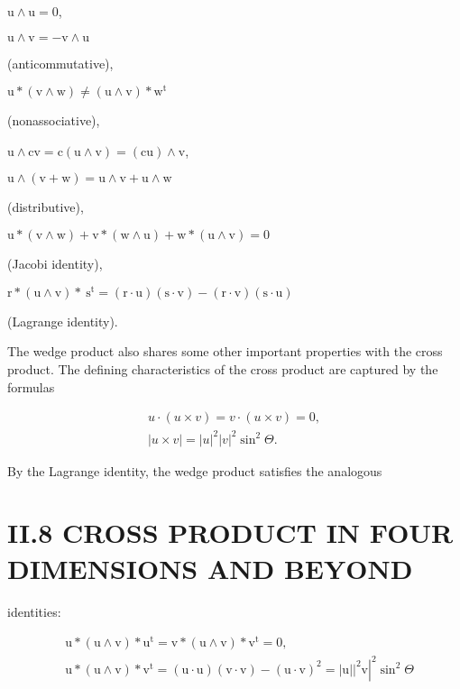 \begin{CJK}{UTF8}{gbsn}
$\mathrm{u} \wedge \mathrm{u}=0$,

$\mathrm{u} \wedge \mathrm{v}=-\mathrm{v} \wedge \mathrm{u}$

(anticommutative),

$\mathrm{u} *(\mathrm{v} \wedge \mathrm{w}) \neq(\mathrm{u} \wedge \mathrm{v}) * \mathrm{w}^{\mathrm{t}}$

(nonassociative),

$\mathrm{u} \wedge \mathrm{cv}=\mathrm{c}(\mathrm{u} \wedge \mathrm{v})=(\mathrm{cu}) \wedge \mathrm{v}$,

$\mathrm{u} \wedge(\mathrm{v}+\mathrm{w})=\mathrm{u} \wedge \mathrm{v}+\mathrm{u} \wedge \mathrm{w}$

(distributive),

$\mathrm{u} *(\mathrm{v} \wedge \mathrm{w})+\mathrm{v} *(\mathrm{w} \wedge \mathrm{u})+\mathrm{w} *(\mathrm{u} \wedge \mathrm{v})=0$

(Jacobi identity),

$\mathrm{r} *(\mathrm{u} \wedge \mathrm{v}) * \mathrm{~s}^{\mathrm{t}}=(\mathrm{r} \cdot \mathrm{u})(\mathrm{s} \cdot \mathrm{v})-(\mathrm{r} \cdot \mathrm{v})(\mathrm{s} \cdot \mathrm{u})$

(Lagrange identity).

The wedge product also shares some other important properties with the cross product. The defining characteristics of the cross product are captured by the formulas

$$
\begin{gathered}
u \cdot(u \times v)=v \cdot(u \times v)=0, \\
|u \times v|=|u|^{2}|v|^{2} \sin ^{2} \Theta .
\end{gathered}
$$

By the Lagrange identity, the wedge product satisfies the analogous

\section{II.8 CROSS PRODUCT IN FOUR DIMENSIONS AND BEYOND}
identities:

$$
\begin{aligned}
&\mathrm{u} *(\mathrm{u} \wedge \mathrm{v}) * \mathrm{u}^{\mathrm{t}}=\mathrm{v} *(\mathrm{u} \wedge \mathrm{v}) * \mathrm{v}^{\mathrm{t}}=0, \\
&\mathrm{u} *(\mathrm{u} \wedge \mathrm{v}) * \mathrm{v}^{\mathrm{t}}=(\mathrm{u} \cdot \mathrm{u})(\mathrm{v} \cdot \mathrm{v})-(\mathrm{u} \cdot \mathrm{v})^{2}=\left.\left.|\mathrm{u}|\right|^{2} \mathrm{v}\right|^{2} \sin ^{2} \Theta
\end{aligned}
$$


\end{CJK}
